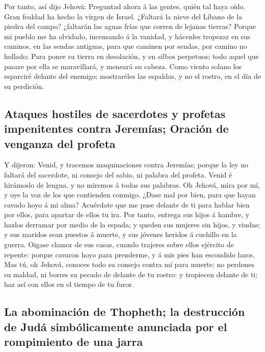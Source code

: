  Por tanto, así dijo Jehová: Preguntad ahora á las
gentes, quién tal haya oído. Gran fealdad ha hecho la virgen de Israel.
 ¿Faltará la nieve del Líbano de la piedra del campo?
¿faltarán las aguas frías que corren de lejanas tierras? 
Porque mi pueblo me ha olvidado, incensando á la vanidad, y hácenles
tropezar en sus caminos, en las sendas antiguas, para que caminen por
sendas, por camino no hollado;  Para poner su tierra en
desolación, y en silbos perpetuos; todo aquel que pasare por ella se
maravillará, y meneará su cabeza.  Como viento solano los
esparciré delante del enemigo; mostraréles las espaldas, y no el rostro,
en el día de su perdición.

\hypertarget{ataques-hostiles-de-sacerdotes-y-profetas-impenitentes-contra-jeremuxedas-oraciuxf3n-de-venganza-del-profeta}{%
\subsection{Ataques hostiles de sacerdotes y profetas impenitentes
contra Jeremías; Oración de venganza del
profeta}\label{ataques-hostiles-de-sacerdotes-y-profetas-impenitentes-contra-jeremuxedas-oraciuxf3n-de-venganza-del-profeta}}

 Y dijeron: Venid, y tracemos maquinaciones contra
Jeremías; porque la ley no faltará del sacerdote, ni consejo del sabio,
ni palabra del profeta. Venid é hirámoslo de lengua, y no miremos á
todas sus palabras.  Oh Jehová, mira por mí, y oye la voz
de los que contienden conmigo.  ¿Dase mal por bien, para
que hayan cavado hoyo á mi alma? Acuérdate que me puse delante de ti
para hablar bien por ellos, para apartar de ellos tu ira.
 Por tanto, entrega sus hijos á hambre, y hazlos derramar
por medio de la espada; y queden sus mujeres sin hijos, y viudas; y sus
maridos sean puestos á muerte, y sus jóvenes heridos á cuchillo en la
guerra.  Oigase clamor de sus casas, cuando trajeres
sobre ellos ejército de repente: porque cavaron hoyo para prenderme, y á
mis pies han escondido lazos.  Mas tú, oh Jehová, conoces
todo su consejo contra mí para muerte; no perdones su maldad, ni borres
su pecado de delante de tu rostro: y tropiecen delante de ti; haz así
con ellos en el tiempo de tu furor.

\hypertarget{la-abominaciuxf3n-de-thopheth-la-destrucciuxf3n-de-juduxe1-simbuxf3licamente-anunciada-por-el-rompimiento-de-una-jarra}{%
\subsection{La abominación de Thopheth; la destrucción de Judá
simbólicamente anunciada por el rompimiento de una
jarra}\label{la-abominaciuxf3n-de-thopheth-la-destrucciuxf3n-de-juduxe1-simbuxf3licamente-anunciada-por-el-rompimiento-de-una-jarra}}

